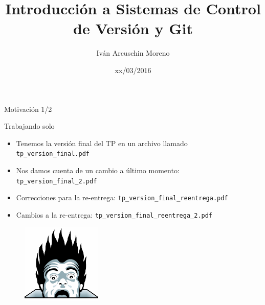 \documentclass{beamer}
\title[SCV y Git]{Introducción a Sistemas de Control de Versión y Git}
\author[Iván Arcuschin]{Iván Arcuschin Moreno}
\institute{DC - FCEyN - UBA}
\date{xx/03/2016}
\begin{document}
\begin{frame}
  \titlepage
\end{frame}

\begin{frame}{Motivación 1/2}

    \begin{block}{Trabajando solo}
        \begin{itemize}
            \item Tenemos la versión final del TP en un archivo llamado \texttt{tp\_version\_final.pdf}
            \pause
            \item Nos damos cuenta de un cambio a último momento: \texttt{tp\_version\_final\_2.pdf}
            \pause
            \item Correcciones para la re-entrega: \texttt{tp\_version\_final\_reentrega.pdf}
            \pause
            \item Cambios a la re-entrega: \texttt{tp\_version\_final\_reentrega\_2.pdf}
        \end{itemize}
    \end{block}

    \pause
    \begin{figure}[ht]
        \begin{center}
            \includegraphics[height=1.5in]{horror.png}
        \end{center}
    \end{figure}

\end{frame}
\end{document}
